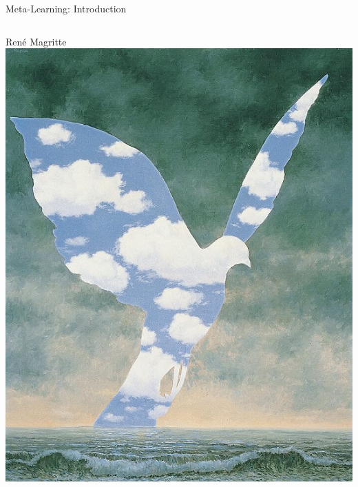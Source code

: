 \begin{frame}[c]{Meta-Learning: Introduction}

\begin{columns}
	Ren\'e Magritte
	\centering
	\includegraphics[width=1.0\textwidth]{images/meta_learning/magritte_1.jpg}

\end{columns}
\end{frame}
